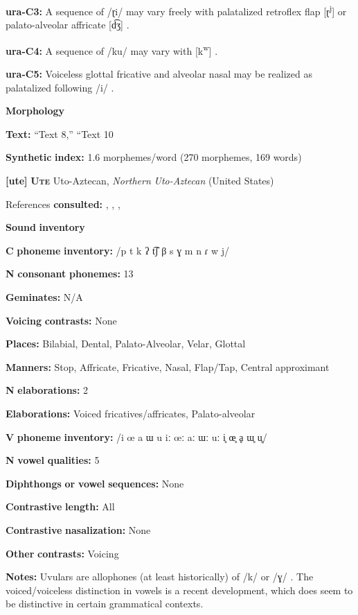 \textbf{ura-C3:} A sequence of /ɽi/ may vary freely with palatalized retroflex flap [ɽ\textsuperscript{j}] or palato-alveolar affricate [d͡ʒ] \citep[71]{Olawsky2006}.

\textbf{ura-C4:} A sequence of /ku/ may vary with [k\textsuperscript{w}] \citep[37]{Olawsky2006}.

\textbf{ura-C5:} Voiceless glottal fricative and alveolar nasal may be realized as palatalized following /i/ \citep[47]{Olawsky2006}.

\textbf{Morphology}

\textbf{Text:} “Text 8,” “Text 10 \citep[902-905]{Olawsky2006}

\textbf{Synthetic} \textbf{index:} 1.6 morphemes/word (270 morphemes, 169 words)

\textbf{[ute]}   \textbf{\textsc{Ute}  }  Uto-Aztecan, \textit{Northern} \textit{Uto-Aztecan} (United States)

References \textbf{consulted:} \citet{Givón2011}, \citet{Givón2013}, \citet{Harms1966}, \citet{Oberly2013}

\textbf{Sound} \textbf{inventory}

\textbf{C} \textbf{phoneme} \textbf{inventory:} /p t k ʔ t͡ʃ β s ɣ m n ɾ w j/

\textbf{N} \textbf{consonant} \textbf{phonemes:} 13

\textbf{Geminates:} N/A

\textbf{Voicing} \textbf{contrasts:} None

\textbf{Places:} Bilabial, Dental, Palato-Alveolar, Velar, Glottal

\textbf{Manners:} Stop, Affricate, Fricative, Nasal, Flap/Tap, Central approximant

\textbf{N} \textbf{elaborations:} 2

\textbf{Elaborations:} Voiced fricatives/affricates, Palato-alveolar

\textbf{V} \textbf{phoneme} \textbf{inventory:} /i œ a ɯ u iː œː aː ɯː uː i̥ œ̥ ḁ ɯ̥ u̥/

\textbf{N} \textbf{vowel} \textbf{qualities:} 5

\textbf{Diphthongs} \textbf{or} \textbf{vowel} \textbf{sequences:} None

\textbf{Contrastive} \textbf{length:} All

\textbf{Contrastive} \textbf{nasalization:} None

\textbf{Other} \textbf{contrasts:} Voicing

\textbf{Notes:} Uvulars are allophones (at least historically) of /k/ or /ɣ/ \citep[26]{Givón2011}. The voiced/voiceless distinction in vowels is a recent development, which does seem to be distinctive in certain grammatical contexts.

